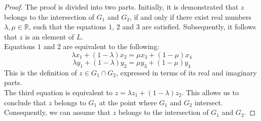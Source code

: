 \begin{proof}
    The proof is divided into two parts. Initially, it is demonstrated that $z$ belongs to the intersection of $G_1$ and $G_2$, if and only if there exist real numbers $\lambda, \mu \in \mathbb{R}$, such that the equations $1$, $2$ and $3$ are satisfied.
    Subsequently, it follows that $z$ is an element of $L$.\\
    Equations $1$ and $2$ are equivalent to the following:
    $$ \lambda x_1 + (1 - \lambda)x_2 = \mu x_3 + (1 - \mu)x_4 $$
    $$ \lambda y_1 + (1 - \lambda)y_2 = \mu y_3 + (1 - \mu)y_4 $$ 
    This is the definition of $z \in G_1 \cap G_2$, expressed in terms of its real and imaginary parts.\\
    The third equation is equivalent to $z = \lambda z_1 + (1 - \lambda)z_2$. This allows us to conclude that $z$ belongs to $G_1$ at the point where $G_1$ and $G_2$ intersect. 
    Consequently, we can assume that $z$ belongs to the intersection of $G_1$ and $G_2$.


\end{proof}
